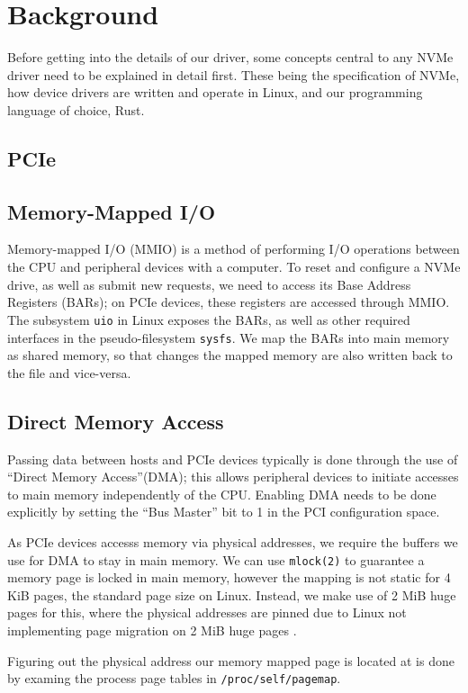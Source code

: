 \chapter{Background}\label{chapter:basics}

Before getting into the details of our driver, some concepts central to any NVMe driver need to be explained in detail first. These being the specification of NVMe, how device drivers are written and operate in Linux, and our programming language of choice, Rust.

\section{PCIe}
\section{Memory-Mapped I/O}
Memory-mapped I/O (MMIO) is a method of performing I/O operations between the CPU and peripheral devices with a computer. To reset and configure a NVMe drive, as well as submit new requests, we need to access its Base Address Registers (BARs); on PCIe devices, these registers are accessed through MMIO. The subsystem \texttt{uio} in Linux exposes the BARs, as well as other required interfaces in the pseudo-filesystem \texttt{sysfs}. We map the BARs into main memory as shared memory, so that changes the mapped memory are also written back to the file and vice-versa.

\section{Direct Memory Access}
Passing data between hosts and PCIe devices typically is done through the use of ``Direct Memory Access''(DMA); this allows peripheral devices to initiate accesses to main memory independently of the CPU. Enabling DMA needs to be done explicitly by setting the ``Bus Master'' bit to 1 in the PCI configuration space.

As PCIe devices accesss memory via physical addresses, we require the buffers we use for DMA to stay in main memory. We can use \texttt{mlock(2)} to guarantee a memory page is locked in main memory, however the mapping is not static for 4 KiB pages, the standard page size on Linux. Instead, we make use of 2 MiB huge pages for this, where the physical addresses are pinned due to Linux not implementing page migration on 2 MiB huge pages \cite{user_space_net}.

Figuring out the physical address our memory mapped page is located at is done by examing the process page tables in \texttt{/proc/self/pagemap}.



